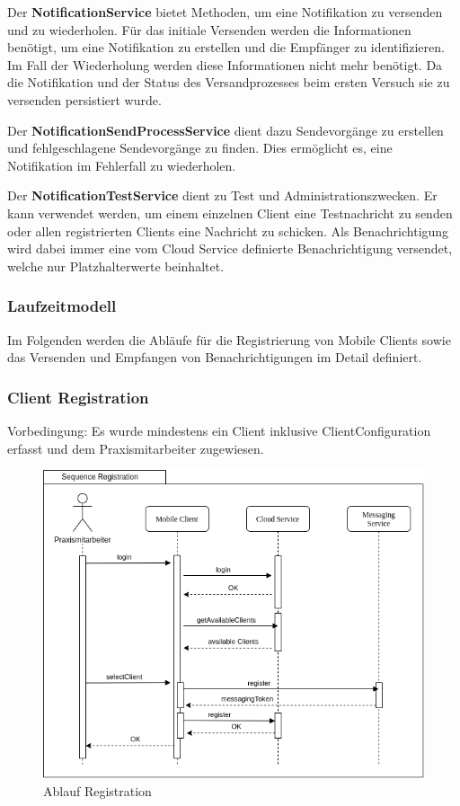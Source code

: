 Der \textbf{NotificationService} bietet Methoden, um eine Notifikation zu versenden und zu wiederholen.
Für das initiale Versenden werden die Informationen benötigt, um eine Notifikation zu erstellen und die Empfänger zu identifizieren.
Im Fall der Wiederholung werden diese Informationen nicht mehr benötigt.
Da die Notifikation und der Status des Versandprozesses beim ersten Versuch sie zu versenden persistiert wurde.

Der \textbf{NotificationSendProcessService} dient dazu Sendevorgänge zu erstellen und fehlgeschlagene Sendevorgänge zu finden.
Dies ermöglicht es, eine Notifikation im Fehlerfall zu wiederholen.

Der \textbf{NotificationTestService} dient zu Test und Administrationszwecken.
Er kann verwendet werden, um einem einzelnen Client eine Testnachricht zu senden oder allen registrierten Clients eine Nachricht zu schicken.
Als Benachrichtigung wird dabei immer eine vom Cloud Service definierte Benachrichtigung versendet, welche nur Platzhalterwerte beinhaltet.

\subsubsection{Laufzeitmodell}

Im Folgenden werden die Abläufe für die Registrierung von Mobile Clients sowie das Versenden und Empfangen von Benachrichtigungen im Detail definiert.

\subsubsection*{Client Registration}

Vorbedingung: Es wurde mindestens ein Client inklusive ClientConfiguration erfasst und dem Praxismitarbeiter zugewiesen.

\begin{figure}[h]
    \centering
    \begin{minipage}[b]{0.7\textwidth}
        \includegraphics[width=\textwidth]{graphics/Sequence_Notification_Register}
        \caption{Ablauf Registration}
    \end{minipage}
\end{figure}

